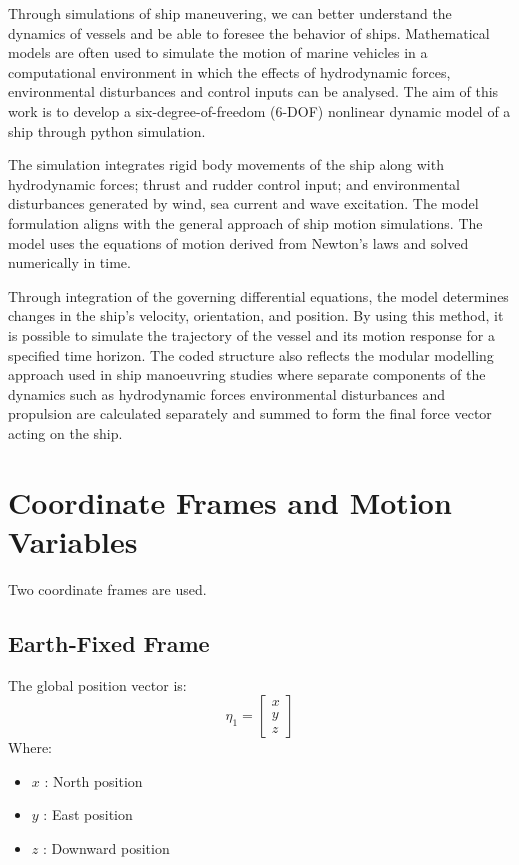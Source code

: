 \documentclass[12pt,a4paper]{report}
\begin{document}
Through simulations of ship maneuvering, we can better understand the dynamics of vessels and be able to foresee the behavior of ships. Mathematical models are often used to simulate the motion of marine vehicles in a computational environment in which the effects of hydrodynamic forces, environmental disturbances and control inputs can be analysed. The aim of this work is to develop a six-degree-of-freedom (6-DOF) nonlinear dynamic model of a ship through python simulation.

The simulation integrates rigid body movements of the ship along with hydrodynamic forces; thrust and rudder control input; and environmental disturbances generated by wind, sea current and wave excitation. The model formulation aligns with the general approach of ship motion simulations. The model uses the equations of motion derived from Newton’s laws and solved numerically in time.

Through integration of the governing differential equations, the model determines changes in the ship's velocity, orientation, and position. By using this method, it is possible to simulate the trajectory of the vessel and its motion response for a specified time horizon. The coded structure also reflects the modular modelling approach used in ship manoeuvring studies where separate components of the dynamics such as hydrodynamic forces environmental disturbances and propulsion are calculated separately and summed to form the final force vector acting on the ship.

\chapter{Coordinate Frames and Motion Variables}

Two coordinate frames are used.

\section{Earth‑Fixed Frame}
The global position vector is:
\begin{equation}
    \eta_1 = \begin{bmatrix} x \\ y \\ z \end{bmatrix}
\end{equation}
Where:
\begin{itemize}
    \item $x$ : North position
    \item $y$ : East position
    \item $z$ : Downward position
\end{itemize}
\end{document}
